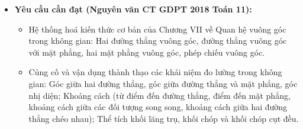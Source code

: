 \documentclass[12pt, a4paper]{article}
\begin{document}
\begin{itemize}[leftmargin=1.2cm]
    \item \textbf{Yêu cầu cần đạt (Nguyên văn CT GDPT 2018 Toán 11):}
    \begin{itemize}[leftmargin=0.6cm]
        \item Hệ thống hoá kiến thức cơ bản của Chương VII về Quan hệ vuông góc trong không gian: Hai đường thẳng vuông góc, đường thẳng vuông góc với mặt phẳng, hai mặt phẳng vuông góc, phép chiếu vuông góc.
        \item Củng cố và vận dụng thành thạo các khái niệm đo lường trong không gian: Góc giữa hai đường thẳng, góc giữa đường thẳng và mặt phẳng, góc nhị diện; Khoảng cách (từ điểm đến đường thẳng, điểm đến mặt phẳng, khoảng cách giữa các đối tượng song song, khoảng cách giữa hai đường thẳng chéo nhau); Thể tích khối lăng trụ, khối chóp và khối chóp cụt đều.
    \end{itemize}


\end{itemize}
\end{document}

